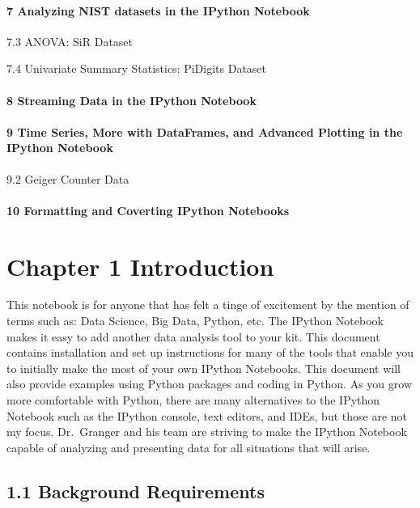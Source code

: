 \documentclass{article}
\begin{document}
    


    \paragraph{7 Analyzing NIST datasets in the IPython Notebook}


    7.3 ANOVA: SiR Dataset

7.4 Univariate Summary Statistics: PiDigits Dataset


    \paragraph{8 Streaming Data in the IPython Notebook}


    


    \paragraph{9 Time Series, More with DataFrames, and Advanced Plotting in the
IPython Notebook}


    9.2 Geiger Counter Data


    \paragraph{10 Formatting and Coverting IPython Notebooks }



    \section{Chapter 1 Introduction}


    This notebook is for anyone that has felt a tinge of excitement by the
mention of terms such as: Data Science, Big Data, Python, etc. The
IPython Notebook makes it easy to add another data analysis tool to your
kit. This document contains installation and set up instructions for
many of the tools that enable you to initially make the most of your own
IPython Notebooks. This document will also provide examples using Python
packages and coding in Python. As you grow more comfortable with Python,
there are many alternatives to the IPython Notebook such as the IPython
console, text editors, and IDEs, but those are not my focus. Dr.~Granger
and his team are striving to make the IPython Notebook capable of
analyzing and presenting data for all situations that will arise.


    \subsection{1.1 Background Requirements}
\end{document}
